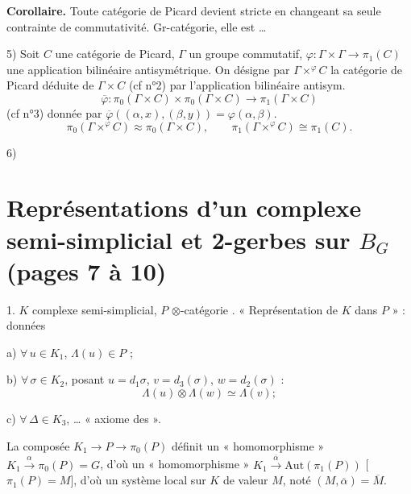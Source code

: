 \documentclass[11pt,a4paper]{article}
\begin{document}
\textbf{Corollaire.} Toute catégorie de Picard devient stricte en
changeant sa seule contrainte de commutativité. 
Gr-catégorie, elle est \ldots
{}

5) Soit $C$ une catégorie de Picard, $\Gamma$ un groupe commutatif,
$\varphi : \Gamma \times \Gamma \to \pi_1(C)$ une application bilinéaire
antisymétrique. On désigne par $\Gamma \times^{\varphi} C$ la catégorie de
Picard déduite de $\Gamma \times C$ (cf n°2) par l'application bilinéaire
antisym.
\[
\overline{\varphi} : \pi_0(\Gamma \times C) \times \pi_0(\Gamma \times C)
\longrightarrow \pi_1(\Gamma \times C)
\]
(cf n°3) donnée par $\overline{\varphi}((\alpha,x),(\beta,y)) =
\varphi(\alpha,\beta)$. 
\[
\pi_0(\Gamma \times^{\varphi} C) \approx \pi_0(\Gamma \times C),
\qquad
\pi_1(\Gamma \times^{\varphi} C) \cong \pi_1(C).
\]

6)

\section*{Représentations d'un complexe semi-simplicial et 2-gerbes sur
$B_G$ (pages 7 à 10)}

1. $K$ complexe semi-simplicial, $P$ 
$\otimes$-catégorie . « Représentation \uncertain{$\Lambda$}
de $K$ dans $P$ » : données

a) $\forall\, u \in K_1$, $\Lambda(u) \in P$ ;

b) $\forall\, \sigma \in K_2$, posant $u = d_1\sigma$, $v = d_3(\sigma)$,
$w = d_2(\sigma)$ :
\[
\Lambda(u) \otimes \Lambda(w) \simeq \Lambda(v) ;
\]

c) $\forall\, \Delta \in K_3$, \ldots{} « axiome des
 ».

La composée $K_1 \to P \to \pi_0(P)$ définit un « homomorphisme »
$K_1 \xrightarrow{\ \alpha\ } \pi_0(P) = G$, d'où un « homomorphisme »
$K_1 \xrightarrow{\ \overline{\alpha}\ } \mathrm{Aut}(\pi_1(P))$
[$\pi_1(P) = M$], d'où un système local sur $K$ de valeur $M$, noté
$(M, \overline{\alpha}) = \overline{M}$.
\end{document}
